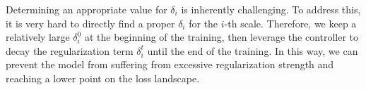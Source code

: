 \documentclass{article}
\begin{document}

Determining an appropriate value for $\delta_{i}$ is inherently challenging. To address this,
it is very hard to directly find a proper $\delta_{i}$ for the $i$-th scale. Therefore, we keep a relatively large $\delta^{0}_{i}$ at the beginning of the training, then leverage the controller to decay the regularization term $\delta^{t}_{i}$ until the end of the training. In  this way, we can prevent the model from suffering from excessive regularization strength and reaching a lower point on the loss landscape.

\end{document}
